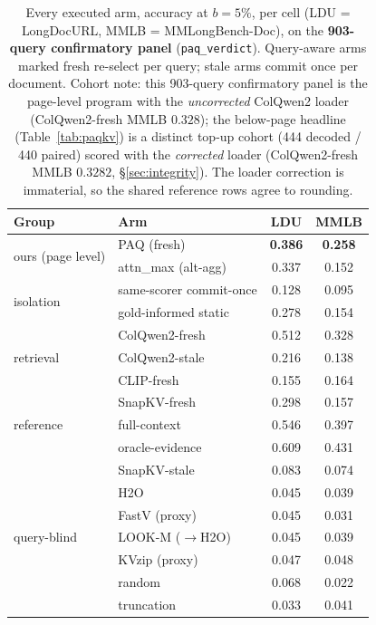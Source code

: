 \documentclass[letterpaper]{article} %
\newcommand{\paq}{\textsc{PAQ}}
\begin{document}
\begin{table}[t]
\centering\small
\setlength{\tabcolsep}{3.5pt}%
\begin{tabular}{llcc}
\toprule
Group & Arm & LDU & MMLB \\
\midrule
\multirow{2}{*}{ours (page level)}
 & \paq{} (fresh) & \textbf{0.386} & \textbf{0.258} \\
 & attn\_max (alt-agg) & 0.337 & 0.152 \\
\midrule
\multirow{2}{*}{isolation}
 & same-scorer commit-once & 0.128 & 0.095 \\
 & gold-informed static & 0.278 & 0.154 \\
\midrule
\multirow{3}{*}{retrieval}
 & ColQwen2-fresh & 0.512 & 0.328 \\
 & ColQwen2-stale & 0.216 & 0.138 \\
 & CLIP-fresh & 0.155 & 0.164 \\
\midrule
\multirow{3}{*}{reference}
 & SnapKV-fresh & 0.298 & 0.157 \\
 & full-context & 0.546 & 0.397 \\
 & oracle-evidence & 0.609 & 0.431 \\
\midrule
\multirow{7}{*}{query-blind}
 & SnapKV-stale & 0.083 & 0.074 \\
 & H2O & 0.045 & 0.039 \\
 & FastV (proxy) & 0.045 & 0.031 \\
 & LOOK-M ($\to$H2O) & 0.045 & 0.039 \\
 & KVzip (proxy) & 0.047 & 0.048 \\
 & random & 0.068 & 0.022 \\
 & truncation & 0.033 & 0.041 \\
\bottomrule
\end{tabular}
\caption{Every executed arm, accuracy at $b{=}5\%$, per cell (LDU = LongDocURL, MMLB = MMLongBench-Doc), on the \textbf{903-query confirmatory panel} (\texttt{paq\_verdict}). Query-aware arms marked fresh re-select per query; stale arms commit once per document. Cohort note: this 903-query confirmatory panel is the page-level program with the \emph{uncorrected} ColQwen2 loader (ColQwen2-fresh MMLB $0.328$); the below-page headline (Table~\ref{tab:paqkv}) is a distinct top-up cohort (444 decoded / 440 paired) scored with the \emph{corrected} loader (ColQwen2-fresh MMLB $0.3282$, \S\ref{sec:integrity}). The loader correction is immaterial, so the shared reference rows agree to rounding.}
\label{tab:panel}
\end{table}
\end{document}
